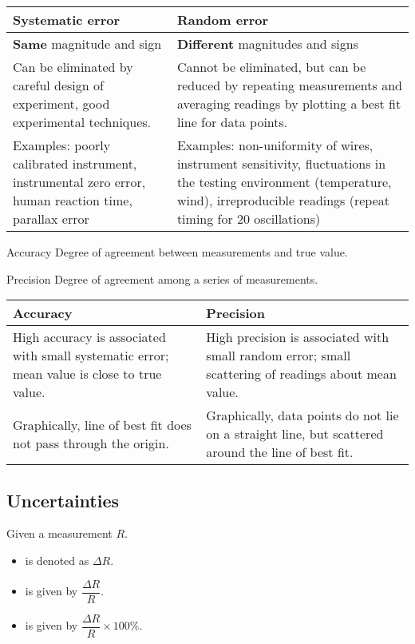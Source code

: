 \begin{table}[H]
    \centering
    \begin{tabular}{p{7.5cm}p{7.5cm}}
    \hline\hline
    \textbf{Systematic error} & \textbf{Random error} \\
    \hline
    \textbf{Same} magnitude and sign & \textbf{Different} magnitudes and signs \\
    Can be eliminated by careful design of experiment, good experimental techniques. & Cannot be eliminated, but can be reduced by repeating measurements and averaging readings by plotting a best fit line for data points. \\
    Examples: poorly calibrated instrument, instrumental zero error, human reaction time, parallax error & Examples: non-uniformity of wires, instrument sensitivity, fluctuations in the testing environment (temperature, wind), irreproducible readings (repeat timing for 20 oscillations) \\
    \hline\hline
    \end{tabular}
\end{table}

\begin{defn}{Accuracy}{}
Degree of agreement between measurements and true value.
\end{defn}

\begin{defn}{Precision}{}
Degree of agreement among a series of measurements.
\end{defn}

\begin{table}[H]
\centering
\begin{tabular}{p{7.5cm}p{7.5cm}}
\hline\hline
\textbf{Accuracy} & \textbf{Precision} \\
\hline
High accuracy is associated with small systematic error; mean value is close to true value. & High precision is associated with small random error; small scattering of readings about mean value. \\
Graphically, line of best fit does not pass through the origin. & Graphically, data points do not lie on a straight line, but scattered around the line of best fit. \\
\hline\hline
\end{tabular}
\end{table}
\pagebreak

\subsection{Uncertainties}
Given a measurement $R$.
\begin{itemize}
\item {} is denoted as $\Delta R$.
\item {} is given by $\dfrac{\Delta R}{R}$.
\item {} is given by $\dfrac{\Delta R}{R} \times 100\%$.
\end{itemize}

